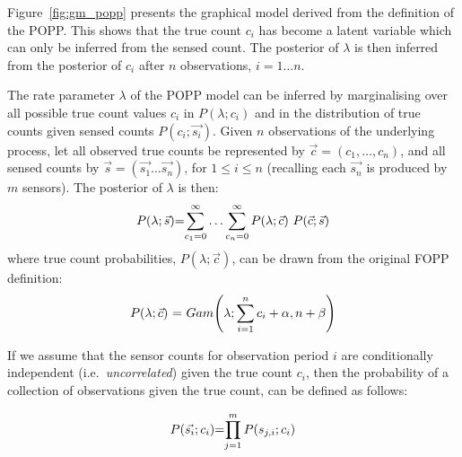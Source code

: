 Figure~\ref{fig:gm_popp} presents the graphical model derived from the definition of the POPP. This shows that the true count $c_i$ has become a latent variable which can only be inferred from the sensed count.
% 
The posterior of $\lambda$ is then inferred from the posterior of $c_i$ after $n$ observations, $i = 1 \ldots n$. 

The rate parameter $\lambda$ of the POPP model can be inferred by marginalising over all possible true count values $c_i$ in $P(\lambda ; c_i)$ and in the  distribution of true counts given sensed counts $P(c_i ; \vec{s_i})$. 
% 
Given $n$ observations of the underlying process, let all observed true counts be represented by $\vec{c} = (c_1, \ldots, c_n)$, and all sensed counts by $\vec{s}=(\vec{s_1} \dots \vec{s_n})$, for $1 \leq i \leq n$ (recalling each $\vec{s_n}$ is produced by $m$ sensors). 
% 
The posterior of $\lambda$ is then:
\begin{equation}
	\label{eq:marginal_occurrences}
	\begin{tabular}{r@{=}l}
		$P(\lambda ; \vec{s})$ &  $\displaystyle\sum_{c_1=0}^{\infty} \ldots \displaystyle\sum_{c_n=0}^{\infty} P(\lambda ; \vec{c}) ~ P(\vec{c} ; \vec{s})$ \\
	\end{tabular}
\end{equation}
\noindent where true count probabilities, $P(\lambda ; \vec{c})$, can be drawn from the original FOPP definition:
\begin{equation*}
	\begin{tabular}{r@{ = }l}
		$P(\lambda ; \vec{c})$ & $Gam\Bigg(\lambda ; \displaystyle\sum_{i=1}^{n} c_i + \alpha, n + \beta \Bigg)$
	\end{tabular}
\end{equation*}


If we assume that the sensor counts for observation period $i$ are conditionally independent (i.e.~\textit{uncorrelated}) given the true count $c_i$, then the probability of a collection of observations given the true count, can be defined as follows: 

\begin{equation}
	\label{eq:independent_sensor_likelihood}
	\begin{tabular}{r@{=}l}
	$P(\vec{s_i} ; c_i)$ & $\displaystyle\prod_{j=1}^{m} P(s_{j,i} ; c_i)$ \\ 
	\end{tabular}
\end{equation}

